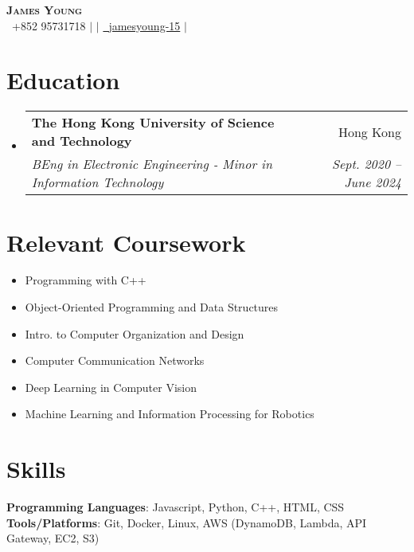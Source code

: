 \documentclass[letterpaper,12pt]{article}
\makeatletter
\newcommand{\resumeSubheading}[4]{
  \vspace{-2pt}\item
    \begin{tabular*}{0.97\textwidth}[t]{l@{\extracolsep{\fill}}r}
      \textbf{#1} & #2 \\
      \textit{\small#3} & \textit{\small #4} \\
    \end{tabular*}\vspace{-7pt}
}
\newcommand{\resumeSubHeadingListStart}{\begin{itemize}[leftmargin=0.05in, label={}]}
\newcommand{\resumeSubHeadingListEnd}{\end{itemize}}
\makeatother
\begin{document}
\begin{center}
    \textbf{\Huge \scshape James Young} \\ \vspace{2pt}
    \small  \faPhone\ {+852 95731718} $|$ 
    \href{mailto:jyyoungaa@connect.ust.hk}{} $|$ 
    \href{https://github.com/jamesyoung-15} {\faGithub\ {jamesyoung-15}} $|$
    \href{https://linkedin.com/in/jamesyyoung}{}
\end{center}


\section{Education}
  \resumeSubHeadingListStart
    \resumeSubheading
      {The Hong Kong University of Science and Technology}{Hong Kong}
      {BEng in Electronic Engineering - Minor in Information Technology}{Sept. 2020 -- June 2024}
  \resumeSubHeadingListEnd

\section{Relevant Coursework}
\vspace{-12pt}
    \begin{multicols}{2}
        \begin{itemize}[itemsep=-1pt, parsep=3pt]
        \footnotesize
            \item Programming with C++
            \item Object-Oriented Programming and Data Structures
            \item Intro. to Computer Organization and Design
            \item Computer Communication Networks
            \item Deep Learning in Computer Vision
            \item Machine Learning and Information Processing for Robotics
        \end{itemize}
    \end{multicols}

\vspace{-25pt}
\section{Skills}
 \begin{itemize}[leftmargin=0.15in, label={}]
    \small{\item{
     \textbf{Programming Languages}{: Javascript, Python, C++, HTML, CSS} \\
     \textbf{Tools/Platforms}{: Git, Docker, Linux, AWS (DynamoDB, Lambda, API Gateway, EC2, S3)} \\
    }}
 \end{itemize}
\end{document}
